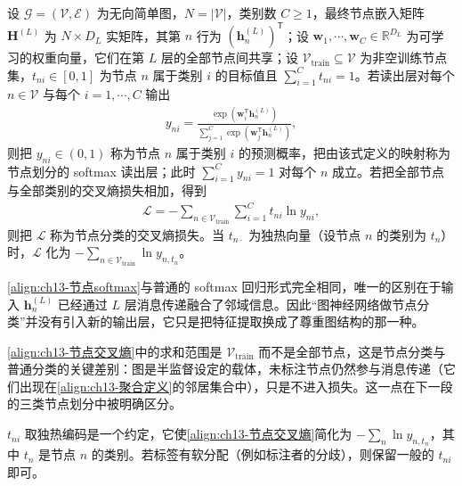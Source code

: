 \documentclass[../../main.tex]{subfiles}
\begin{document}
\begin{definition}[读出层与节点分类损失]\label{definition:ch13-读出层}
设 $\mathcal{G}=(\mathcal{V},\mathcal{E})$ 为无向简单图，$N=|\mathcal{V}|$，类别数 $C\geqslant1$，最终节点嵌入矩阵 $\bm{H}^{(L)}$ 为 $N\times D_L$ 实矩阵，其第 $n$ 行为 $(\bm{h}_n^{(L)})^{\mathsf T}$；设 $\bm{w}_1,\cdots,\bm{w}_C\in\mathbb{R}^{D_L}$ 为可学习的权重向量，它们在第 $L$ 层的全部节点间共享；设 $\mathcal{V}_{\mathrm{train}}\subseteq\mathcal{V}$ 为非空训练节点集，$t_{ni}\in[0,1]$ 为节点 $n$ 属于类别 $i$ 的目标值且 $\sum_{i=1}^{C}t_{ni}=1$。若读出层对每个 $n\in\mathcal{V}$ 与每个 $i=1,\cdots,C$ 输出
\begin{align}
y_{ni}=\frac{\exp\!\left(\bm{w}_i^{\mathsf T}\bm{h}_n^{(L)}\right)}{\sum_{j=1}^{C}\exp\!\left(\bm{w}_j^{\mathsf T}\bm{h}_n^{(L)}\right)},
\label{align:ch13-节点softmax}
\end{align}
则把 $y_{ni}\in(0,1)$ 称为节点 $n$ 属于类别 $i$ 的预测概率，把由该式定义的映射称为节点划分的 softmax 读出层；此时 $\sum_{i=1}^{C}y_{ni}=1$ 对每个 $n$ 成立。若把全部节点与全部类别的交叉熵损失相加，得到
\begin{align}
\mathcal{L}=-\sum_{n\in\mathcal{V}_{\mathrm{train}}}\sum_{i=1}^{C}t_{ni}\ln y_{ni},
\label{align:ch13-节点交叉熵}
\end{align}
则把 $\mathcal{L}$ 称为节点分类的交叉熵损失。当 $t_{n\cdot}$ 为独热向量（设节点 $n$ 的类别为 $t_n$）时，$\mathcal{L}$ 化为 $-\sum_{n\in\mathcal{V}_{\mathrm{train}}}\ln y_{n,t_n}$。
\end{definition}

\begin{remark}
\eqref{align:ch13-节点softmax}与普通的 softmax 回归形式完全相同，唯一的区别在于输入 $\bm{h}_n^{(L)}$ 已经通过 $L$ 层消息传递融合了邻域信息。因此“图神经网络做节点分类”并没有引入新的输出层，它只是把特征提取换成了尊重图结构的那一种。\par
\eqref{align:ch13-节点交叉熵}中的求和范围是 $\mathcal{V}_{\mathrm{train}}$ 而不是全部节点，这是节点分类与普通分类的关键差别：图是半监督设定的载体，未标注节点仍然参与消息传递（它们出现在\eqref{align:ch13-聚合定义}的邻居集合中），只是不进入损失。这一点在下一段的三类节点划分中被明确区分。\par
$t_{ni}$ 取独热编码是一个约定，它使\eqref{align:ch13-节点交叉熵}简化为 $-\sum_{n}\ln y_{n,t_n}$，其中 $t_n$ 是节点 $n$ 的类别。若标签有软分配（例如标注者的分歧），则保留一般的 $t_{ni}$ 即可。
\end{remark}
\end{document}
